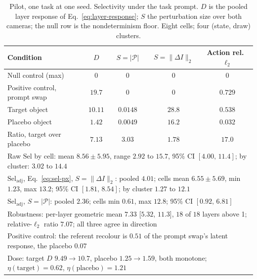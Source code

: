 \begin{table}[t]
\caption{Pilot, one task at one seed. Selectivity under the task prompt. $D$ is the pooled layer response of
Eq.~\ref{eq:layer-response}; $S$ the perturbation size over both cameras; the
null row is the nondeterminism floor. Eight cells; four (state, draw)
clusters.}
\label{tab:cf-main}
\begin{center}
\small
\begin{tabular}{lcccc}
\hline
Condition & $D$ & $S=|\mathcal{P}|$ & $S=\lVert\Delta I\rVert_2$ & Action rel.\ $\ell_2$ \\
\hline
Null control (max)            & $0$ & $0$ & $0$ & $0$ \\
Positive control, prompt swap & $19.7$ & $0$ & $0$ & $0.729$ \\
Target object                 & $10.11$ & $0.0148$ & $28.8$ & $0.538$ \\
Placebo object                & $1.42$  & $0.0049$ & $16.2$ & $0.032$ \\
\hline
Ratio, target over placebo    & $7.13$ & $3.03$ & $1.78$ & $17.0$ \\
\hline
\multicolumn{5}{p{5.1in}}{Raw $\mathrm{Sel}$ by cell: mean $8.56\pm5.95$, range $2.92$ to $15.7$, 95\% CI $[4.00,\,11.4]$; by cluster: $3.02$ to $14.4$} \\
\multicolumn{5}{p{5.1in}}{$\mathrm{Sel}_{\mathrm{adj}}$, Eq.~\ref{eq:sel-px}, $S=\lVert\Delta I\rVert_2$: pooled $4.01$; cells mean $6.55\pm5.69$, min $1.23$, max $13.2$; 95\% CI $[1.81,\,8.54]$; by cluster $1.27$ to $12.1$} \\
\multicolumn{5}{p{5.1in}}{$\mathrm{Sel}_{\mathrm{adj}}$, $S=|\mathcal{P}|$: pooled $2.36$; cells min $0.61$, max $12.8$; 95\% CI $[0.92,\,6.81]$} \\
\multicolumn{5}{p{5.1in}}{Robustness: per-layer geometric mean $7.33$ [$5.32$, $11.3$], $18$ of $18$ layers above 1; relative-$\ell_2$ ratio $7.07$; all three agree in direction} \\
\multicolumn{5}{p{5.1in}}{Positive control: the referent recolour is $0.51$ of the prompt swap's latent response, the placebo $0.07$} \\
\multicolumn{5}{p{5.1in}}{Dose: target $D$ $9.49\rightarrow10.7$, placebo $1.25\rightarrow1.59$, both monotone; $\eta(\mathrm{target})=0.62$, $\eta(\mathrm{placebo})=1.21$} \\
\hline
\end{tabular}
\end{center}
\end{table}

